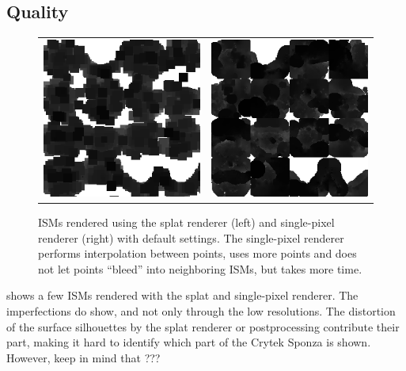 \subsection{Quality}
\label{sec:results:ism:quality}

\begin{figure}[htb]
\centering
  \begin{tabular}{@{}cc@{}}
    \includegraphics[width=.48\textwidth]{screenshots/ism_splat_cropped} &
    \includegraphics[width=.48\textwidth]{screenshots/ism_single_pixel_cropped}
  \end{tabular}
  \caption{ISMs rendered using the splat renderer (left) and single-pixel renderer (right) with default settings. The single-pixel renderer performs interpolation between points, uses more points and does not let points ``bleed'' into neighboring ISMs, but takes more time.}
  \label{fig:results:isms}
\end{figure}

 shows a few ISMs rendered with the splat and single-pixel renderer. The imperfections do show, and not only through the low resolutions. The distortion of the surface silhouettes by the splat renderer or postprocessing contribute their part, making it hard to identify which part of the Crytek Sponza is shown. However, keep in mind that ???

